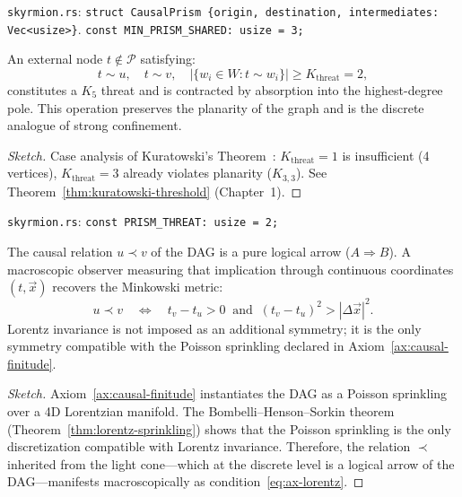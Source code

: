 \medskip\noindent
\texttt{skyrmion.rs}: \texttt{struct CausalPrism \{origin,
destination, intermediates: Vec<usize>\}}.
\texttt{const MIN\_PRISM\_SHARED: usize = 3;}


\begin{theorem}
\label{thm:kuratowski-threat}
An external node $t \notin \mathcal{P}$ satisfying:
\begin{equation}
  t \sim u,\quad t \sim v,\quad |\{w_i \in W : t \sim w_i\}|
  \geq K_{\text{threat}} = 2,
  \label{eq:ax-threat}
\end{equation}
constitutes a $K_5$ threat and is contracted by absorption into the
highest-degree pole. This operation preserves the planarity
of the graph and is the discrete analogue of strong confinement.
\end{theorem}

\begin{proof}[Sketch]
Case analysis of Kuratowski's Theorem~\cite{kuratowski1930}:
$K_{\text{threat}} = 1$ is insufficient (4 vertices),
$K_{\text{threat}} = 3$ already violates planarity ($K_{3,3}$).
See Theorem~\ref{thm:kuratowski-threshold} (Chapter~1).
\end{proof}

\medskip\noindent
\texttt{skyrmion.rs}: \texttt{const PRISM\_THREAT: usize = 2;}

\begin{theorem}
\label{thm:lorentzian-causality}
The causal relation $u \prec v$ of the DAG is a pure logical arrow
($A \Rightarrow B$). A macroscopic observer measuring that
implication through continuous coordinates $(t, \vec{x})$ recovers
the Minkowski metric:
\begin{equation}
  u \prec v
  \quad\Longleftrightarrow\quad
  t_v - t_u > 0
  \;\;\text{and}\;\;
  (t_v - t_u)^2 > |\Delta\vec{x}|^2.
  \label{eq:ax-lorentz}
\end{equation}
Lorentz invariance is not imposed as an additional symmetry;
it is the only symmetry compatible with the Poisson sprinkling
declared in Axiom~\ref{ax:causal-finitude}.
\end{theorem}

\begin{proof}[Sketch]
Axiom~\ref{ax:causal-finitude} instantiates the DAG as a
Poisson sprinkling over a 4D Lorentzian manifold.
The Bombelli--Henson--Sorkin theorem~\cite{bombelli2009}
(Theorem~\ref{thm:lorentz-sprinkling}) shows that the
Poisson sprinkling is the only discretization
compatible with Lorentz invariance. Therefore, the
relation $\prec$ inherited from the light cone---which at the discrete level
is a logical arrow of the DAG---manifests macroscopically
as condition~\eqref{eq:ax-lorentz}.
\end{proof}

